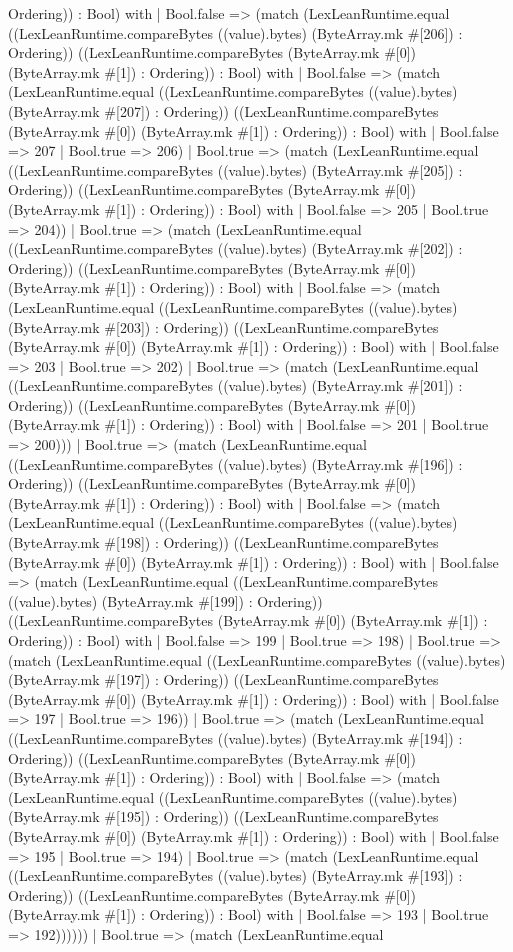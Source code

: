 \documentclass[11pt]{article}
\begin{document}
Ordering)) : Bool) with | Bool.false => (match (LexLeanRuntime.equal ((LexLeanRuntime.compareBytes ((value).bytes) (ByteArray.mk \#[206]) : Ordering)) ((LexLeanRuntime.compareBytes (ByteArray.mk \#[0]) (ByteArray.mk \#[1]) : Ordering)) : Bool) with | Bool.false => (match (LexLeanRuntime.equal ((LexLeanRuntime.compareBytes ((value).bytes) (ByteArray.mk \#[207]) : Ordering)) ((LexLeanRuntime.compareBytes (ByteArray.mk \#[0]) (ByteArray.mk \#[1]) : Ordering)) : Bool) with | Bool.false => 207 | Bool.true => 206) | Bool.true => (match (LexLeanRuntime.equal ((LexLeanRuntime.compareBytes ((value).bytes) (ByteArray.mk \#[205]) : Ordering)) ((LexLeanRuntime.compareBytes (ByteArray.mk \#[0]) (ByteArray.mk \#[1]) : Ordering)) : Bool) with | Bool.false => 205 | Bool.true => 204)) | Bool.true => (match (LexLeanRuntime.equal ((LexLeanRuntime.compareBytes ((value).bytes) (ByteArray.mk \#[202]) : Ordering)) ((LexLeanRuntime.compareBytes (ByteArray.mk \#[0]) (ByteArray.mk \#[1]) : Ordering)) : Bool) with | Bool.false => (match (LexLeanRuntime.equal ((LexLeanRuntime.compareBytes ((value).bytes) (ByteArray.mk \#[203]) : Ordering)) ((LexLeanRuntime.compareBytes (ByteArray.mk \#[0]) (ByteArray.mk \#[1]) : Ordering)) : Bool) with | Bool.false => 203 | Bool.true => 202) | Bool.true => (match (LexLeanRuntime.equal ((LexLeanRuntime.compareBytes ((value).bytes) (ByteArray.mk \#[201]) : Ordering)) ((LexLeanRuntime.compareBytes (ByteArray.mk \#[0]) (ByteArray.mk \#[1]) : Ordering)) : Bool) with | Bool.false => 201 | Bool.true => 200))) | Bool.true => (match (LexLeanRuntime.equal ((LexLeanRuntime.compareBytes ((value).bytes) (ByteArray.mk \#[196]) : Ordering)) ((LexLeanRuntime.compareBytes (ByteArray.mk \#[0]) (ByteArray.mk \#[1]) : Ordering)) : Bool) with | Bool.false => (match (LexLeanRuntime.equal ((LexLeanRuntime.compareBytes ((value).bytes) (ByteArray.mk \#[198]) : Ordering)) ((LexLeanRuntime.compareBytes (ByteArray.mk \#[0]) (ByteArray.mk \#[1]) : Ordering)) : Bool) with | Bool.false => (match (LexLeanRuntime.equal ((LexLeanRuntime.compareBytes ((value).bytes) (ByteArray.mk \#[199]) : Ordering)) ((LexLeanRuntime.compareBytes (ByteArray.mk \#[0]) (ByteArray.mk \#[1]) : Ordering)) : Bool) with | Bool.false => 199 | Bool.true => 198) | Bool.true => (match (LexLeanRuntime.equal ((LexLeanRuntime.compareBytes ((value).bytes) (ByteArray.mk \#[197]) : Ordering)) ((LexLeanRuntime.compareBytes (ByteArray.mk \#[0]) (ByteArray.mk \#[1]) : Ordering)) : Bool) with | Bool.false => 197 | Bool.true => 196)) | Bool.true => (match (LexLeanRuntime.equal ((LexLeanRuntime.compareBytes ((value).bytes) (ByteArray.mk \#[194]) : Ordering)) ((LexLeanRuntime.compareBytes (ByteArray.mk \#[0]) (ByteArray.mk \#[1]) : Ordering)) : Bool) with | Bool.false => (match (LexLeanRuntime.equal ((LexLeanRuntime.compareBytes ((value).bytes) (ByteArray.mk \#[195]) : Ordering)) ((LexLeanRuntime.compareBytes (ByteArray.mk \#[0]) (ByteArray.mk \#[1]) : Ordering)) : Bool) with | Bool.false => 195 | Bool.true => 194) | Bool.true => (match (LexLeanRuntime.equal ((LexLeanRuntime.compareBytes ((value).bytes) (ByteArray.mk \#[193]) : Ordering)) ((LexLeanRuntime.compareBytes (ByteArray.mk \#[0]) (ByteArray.mk \#[1]) : Ordering)) : Bool) with | Bool.false => 193 | Bool.true => 192)))))) | Bool.true => (match (LexLeanRuntime.equal 
\end{document}
